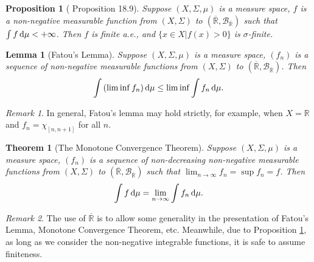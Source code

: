 \documentclass[openany]{book}
\newtheorem{lemma}{Lemma}[chapter]
\newtheorem{proposition}{Proposition}[chapter]
\newtheorem{theorem}{Theorem}[chapter]
\theoremstyle{definition}
\theoremstyle{remark}
\newtheorem*{remark}{Remark}
\begin{document}
\begin{proposition}[\cite{RF88} Proposition 18.9]\label{prop:inftyZeroMeasure}
    Suppose $(X,\Sigma,\mu)$ is a measure space, $f$ is a non-negative measurable function from $(X,\Sigma)$ to $(\overline{\mathbb{R}},\mathcal{B}_{\overline{\mathbb{R}}})$ such that $\int f \dif\mu<+\infty$. Then $f$ is finite a.e., and $\{x\in X|f(x)>0\}$ is $\sigma$-finite.
\end{proposition}
\begin{lemma}[Fatou's Lemma]
    Suppose $(X,\Sigma,\mu)$ is a measure space, $(f_n)$ is a sequence of non-negative measurable functions from $(X,\Sigma)$ to $(\overline{\mathbb{R}},\mathcal{B}_{\overline{\mathbb{R}}})$. Then
    \begin{equation*}
        \int\left(\lim\inf f_n\right)\dif\mu\le\lim\inf\int f_n \dif\mu.
    \end{equation*}
\end{lemma}
\begin{remark}
    In general, Fatou's lemma may hold strictly, for example, when $X=\mathbb{R}$ and $f_n=\chi_{[n,n+1]}$ for all $n$.
\end{remark}
\begin{theorem}[The Monotone Convergence Theorem]
    Suppose $(X,\Sigma,\mu)$ is a measure space, $(f_n)$ is a sequence of non-decreasing non-negative measurable functions from $(X,\Sigma)$ to $(\overline{\mathbb{R}},\mathcal{B}_{\overline{\mathbb{R}}})$ such that $\lim_{n\to\infty}f_n=\sup f_n=f$. Then
    \begin{equation*}
        \int f \dif\mu=\lim_{n\to\infty}\int f_n \dif\mu.
    \end{equation*}
\end{theorem}
\begin{remark}
    The use of $\overline{\mathbb{R}}$ is to allow some generality in the presentation of Fatou's Lemma, Monotone Convergence Theorem, etc. Meanwhile, due to Proposition \ref{prop:inftyZeroMeasure}, as long as we consider the non-negative integrable functions, it is safe to assume finiteness.
\end{remark}
\end{document}
